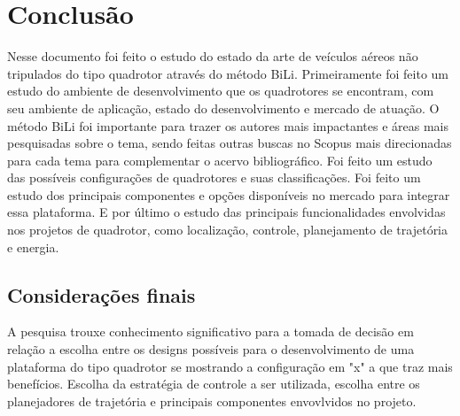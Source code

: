 \chapter{Conclusão}
\label{chap:conc}

Nesse documento foi feito o estudo do estado da arte de veículos aéreos não tripulados do tipo quadrotor através do método BiLi. Primeiramente foi feito um estudo do ambiente de desenvolvimento que os quadrotores se encontram, com seu ambiente de aplicação, estado do desenvolvimento e mercado de atuação. O método BiLi foi importante para trazer os autores mais impactantes e áreas mais pesquisadas sobre o tema, sendo feitas outras buscas no Scopus mais direcionadas para cada tema para complementar o acervo bibliográfico. Foi feito um estudo das possíveis configurações de quadrotores e suas classificações. Foi feito um estudo dos principais componentes e opções disponíveis no mercado para integrar essa plataforma. E por último o estudo das principais funcionalidades envolvidas nos projetos de quadrotor, como localização, controle, planejamento de trajetória e energia. 


\section{Considerações finais}
\label{sec:consid}

A pesquisa trouxe conhecimento significativo para a tomada de decisão em relação a escolha entre os designs possíveis para o desenvolvimento de uma plataforma do tipo quadrotor se mostrando a configuração em "x" a que traz mais benefícios. Escolha da estratégia de controle a ser utilizada, escolha entre os planejadores de trajetória e principais componentes envovlvidos no projeto.


